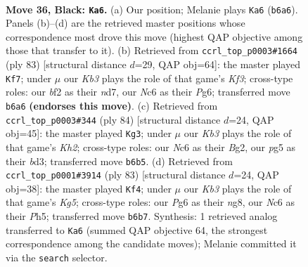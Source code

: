 \documentclass[11pt]{article}
\begin{document}
\clearpage

\begin{figure}[p]\centering
\begin{subfigure}{0.46\textwidth}\centering
\resizebox{\linewidth}{!}{%
\newchessgame
\chessboard[
  setfen={8/8/1knb2p1/6P1/p1b5/8/5B2/4K1N1 b - - 7 36},
  showmover=false,
  pgfstyle=straightmove, color=movearrow, markmove={b6-a6}
]}
\caption{}
\end{subfigure}\hfill
\begin{subfigure}{0.46\textwidth}\centering
\resizebox{\linewidth}{!}{%
\newchessgame
\chessboard[
  setfen={8/3N4/5kpp/8/6B1/1bB5/5KP1/2r5 b - - 7 42},
  showmover=false,
  pgfstyle=straightmove, color=movearrow, markmove={f6-f7}
]}
\caption{}
\end{subfigure}
\\[4pt]
\begin{subfigure}{0.46\textwidth}\centering
\resizebox{\linewidth}{!}{%
\newchessgame
\chessboard[
  setfen={7r/8/6k1/B5p1/6P1/3b4/5PBK/8 w - - 1 43},
  showmover=false,
  pgfstyle=straightmove, color=movearrow, markmove={h2-g3}
]}
\caption{}
\end{subfigure}\hfill
\begin{subfigure}{0.46\textwidth}\centering
\resizebox{\linewidth}{!}{%
\newchessgame
\chessboard[
  setfen={6N1/1bn5/8/7p/6k1/8/4B3/5K2 b - - 1 42},
  showmover=false,
  pgfstyle=straightmove, color=movearrow, markmove={g4-f4}
]}
\caption{}
\end{subfigure}
\caption{\textbf{Move 36, Black: \texttt{Ka6}.} (a) Our position; Melanie plays \texttt{Ka6} (\texttt{b6a6}). Panels (b)--(d) are the retrieved master positions whose correspondence most drove this move (highest QAP objective among those that transfer to it). (b) Retrieved from \texttt{ccrl\_top\_p0003\#1664} (ply 83) [structural distance $d$=29, QAP obj=64]: the master played \texttt{Kf7}; under $\mu$ our \emph{Kb3} plays the role of that game's \emph{Kf3}; cross-type roles: our \emph{b}f2 as their \emph{n}d7, our \emph{N}c6 as their \emph{P}g6; transferred move \texttt{b6a6} \textbf{(endorses this move)}. (c) Retrieved from \texttt{ccrl\_top\_p0003\#344} (ply 84) [structural distance $d$=24, QAP obj=45]: the master played \texttt{Kg3}; under $\mu$ our \emph{Kb3} plays the role of that game's \emph{Kh2}; cross-type roles: our \emph{N}c6 as their \emph{B}g2, our \emph{p}g5 as their \emph{b}d3; transferred move \texttt{b6b5}. (d) Retrieved from \texttt{ccrl\_top\_p0001\#3914} (ply 83) [structural distance $d$=24, QAP obj=38]: the master played \texttt{Kf4}; under $\mu$ our \emph{Kb3} plays the role of that game's \emph{Kg5}; cross-type roles: our \emph{P}g6 as their \emph{n}g8, our \emph{N}c6 as their \emph{P}h5; transferred move \texttt{b6b7}. Synthesis: 1 retrieved analog transferred to \texttt{Ka6} (summed QAP objective 64, the strongest correspondence among the candidate moves); Melanie committed it via the \texttt{search} selector.}
\label{fig:thought-m71}
\end{figure}
\end{document}
